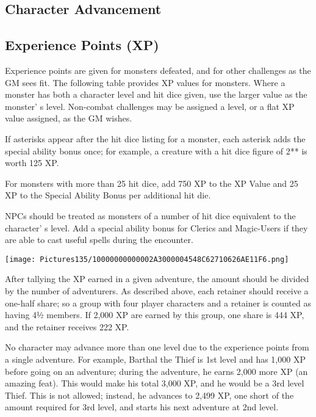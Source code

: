 \documentclass[a4paper,twoside,openany,10pt]{book}
\begin{document}
\subsection{Character Advancement}\label{character-advancement}

\begin{multicols}{2}

\subsection{Experience Points (XP)}\label{experience-points-xp}

Experience points are given for monsters defeated, and for other challenges as the GM sees fit. The following table provides XP values for monsters. Where a monster has both a character level and hit dice given, use the larger value as the monster' s level. Non-combat challenges may be assigned a level, or a flat XP value assigned, as the GM wishes.

If asterisks appear after the hit dice listing for a monster, each asterisk adds the special ability bonus once; for example, a creature with a hit dice figure of 2** is worth 125 XP.

For monsters with more than 25 hit dice, add 750 XP to the XP Value and 25 XP to the Special Ability Bonus per additional hit die. 

NPCs should be treated as monsters of a number of hit dice equivalent to the character' s level. Add a special ability bonus for Clerics and Magic-Users if they are able to cast useful spells during the encounter.


\begin{flushleft}
	\texttt{[image: Pictures135/10000000000002A3000004548C62710626AE11F6.png]}
\end{flushleft}

After tallying the XP earned in a given adventure, the amount should be divided by the number of adventurers. As described above, each retainer should receive a one-half share; so a group with four player characters and a retainer is counted as having 4½ members. If 2,000 XP are earned by this group, one share is 444 XP, and the retainer receives 222 XP. 

No character may advance more than one level due to the experience points from a single adventure. For example, Barthal the Thief is 1st level and has 1,000 XP before going on an adventure; during the adventure, he earns 2,000 more XP (an amazing feat). This would make his total 3,000 XP, and he would be a 3rd level Thief. This is not allowed; instead, he advances to 2,499 XP, one short of the amount required for 3rd level, and starts his next adventure at 2nd level.\\\medskip


\end{multicols}
\end{document}

